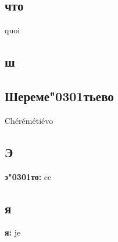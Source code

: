 \documentclass[a5paper, 10pt]{article}
\newcommand{\лекси}[2]{{\textbf{#1: }{#2}\par}}
\newcommand{\ак}[0]{\char"0301} %
\begin{document}
\begin{multicols}{2}
  \subsection*{что}{quoi}

  \subsection*{ш}
  \subsection*{Шереме\ак тьево}{Chérémétiévo}
  
  \subsection*{Э}
  
  \лекси{э\ак то}{ce}

  \subsection*{я}

  \лекси{я}{je}
  
\end{multicols}
\end{document}
